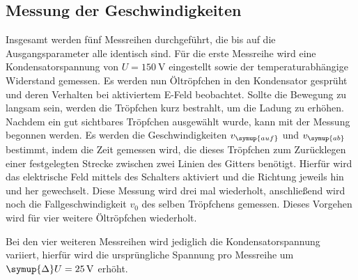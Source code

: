 \subsection{Messung der Geschwindigkeiten}
Insgesamt werden fünf Messreihen durchgeführt, die bis auf die Ausgangsparameter alle identisch sind.
Für die erste Messreihe wird eine Kondensatorspannung von $U=\qty{150}{\volt}$ eingestellt sowie der temperaturabhängige
Widerstand gemessen.
Es werden nun Öltröpfchen in den Kondensator gesprüht und deren Verhalten bei aktiviertem E-Feld beobachtet.
Sollte die Bewegung zu langsam sein, werden die Tröpfchen kurz bestrahlt, um die Ladung zu erhöhen.
Nachdem ein gut sichtbares Tröpfchen ausgewählt wurde, kann mit der Messung begonnen werden.
Es werden die Geschwindigkeiten $v_{\symup{auf}}$ und $v_{\symup{ab}}$ bestimmt, indem die Zeit gemessen wird,
die dieses Tröpfchen zum Zurücklegen einer festgelegten Strecke zwischen zwei Linien des Gitters benötigt.
Hierfür wird das elektrische Feld mittels des Schalters aktiviert und die Richtung jeweils hin und her gewechselt.
Diese Messung wird drei mal wiederholt, anschließend wird noch die Fallgeschwindigkeit $v_0$ des selben Tröpfchens gemessen.
Dieses Vorgehen wird für vier weitere Öltröpfchen wiederholt.

Bei den vier weiteren Messreihen wird jediglich die Kondensatorspannung variiert, hierfür wird die ursprüngliche
Spannung pro Messreihe um $\symup{\Delta}U=\qty{25}{\volt}$ erhöht.